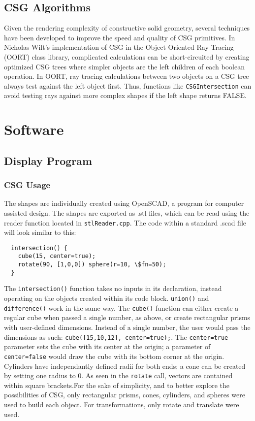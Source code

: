 \documentclass[12pt]{article}
\begin{document}
\subsection{CSG Algorithms}
Given the rendering complexity of constructive solid geometry, several techniques have been developed to improve the speed and quality of CSG primitives. In Nicholas Wilt's implementation of CSG in the Object Oriented Ray Tracing (OORT) class library, complicated calculations can be short-circuited by creating optimized CSG trees where simpler objects are the left children of each boolean operation. In OORT, ray tracing calculations between two objects on a CSG tree always test against the left object first. Thus, functions like \texttt{CSGIntersection} can avoid testing rays against more complex shapes if the left shape returns FALSE\cite{raytrace}.
\section{Software}
\subsection{Display Program}
\subsubsection{CSG Usage}
The shapes are individually created using OpenSCAD, a program for computer assisted design. The shapes are exported as .stl files, which can be read using the reader function located in \texttt{stlReader.cpp}. The code within a standard .scad file will look similar to this:
\lstset{language=scad}
\begin{lstlisting}
  intersection() {
    cube(15, center=true);
    rotate(90, [1,0,0]) sphere(r=10, \$fn=50);
  }
\end{lstlisting}
The \texttt{intersection()} function takes no inputs in its declaration, instead operating on the objects created within its code block. \texttt{union()} and \texttt{difference()} work in the same way. The \texttt{cube()} function can either create a regular cube when passed a single number, as above, or create rectangular prisms with user-defined dimensions. Instead of a single number, the user would pass the dimensions as such: \texttt{cube([15,10,12], center=true);}. The \texttt{center=true} parameter sets the cube with its center at the origin; a parameter of \texttt{center=false} would draw the cube with its bottom corner at the origin. Cylinders have independantly defined radii for both ends; a cone can be created by setting one radius to 0. As seen in the \texttt{rotate} call, vectors are contained within square brackets.For the sake of simplicity, and to better explore the possibilities of CSG, only rectangular prisms, cones, cylinders, and spheres were used to build each object. For transformations, only rotate and translate were used.\\
\end{document}
